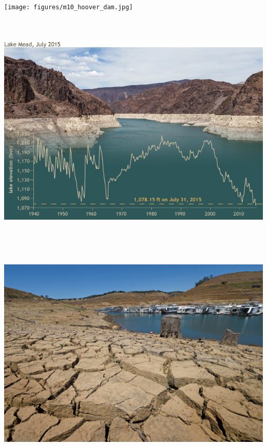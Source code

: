 \documentclass[]{article}
\begin{document}
\hypertarget{section-8}{%
\subsection{}\label{section-8}}

\texttt{[image: figures/m10\_hoover\_dam.jpg]}

\hypertarget{section-9}{%
\subsection{}\label{section-9}}

\includegraphics[width=\textwidth,height=4.16667in]{figures/m10_lake_mead_level.jpg}

\hypertarget{section-10}{%
\subsection{}\label{section-10}}

\includegraphics[width=\textwidth,height=4.16667in]{figures/m10_california_drought.jpg}
\end{document}
